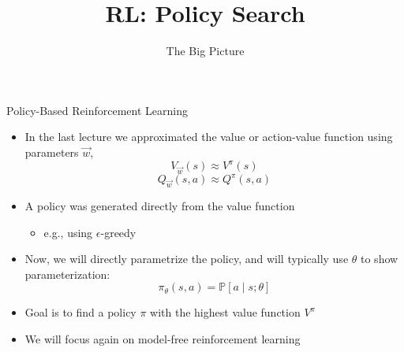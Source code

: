


\title[RL: Big Picture]{RL: Policy Search}
\subtitle{The Big Picture}




	
	\maketitle

\begin{frame}[c]{Policy-Based Reinforcement Learning}

\begin{itemize}
	\item In the last lecture we approximated the value or action-value function
	using parameters $\vec{w}$,
	$$V_{\vec{w}}(s) \approx V^\pi(s)$$
	$$Q_{\vec{w}}(s,a) \approx Q^\pi (s,a) $$
	\item A policy was generated directly from the value function
	\begin{itemize}
		\item e.g., using $\epsilon$-greedy
	\end{itemize}	
	\item Now, we will directly parametrize the policy, and will typically
	use $\theta$ to show parameterization:
	$$\pi_\theta (s,a) = \mathbb{P}[ a\mid s; \theta] $$
	\item Goal is to find a policy $\pi$ with the highest value function $V^\pi$
	\item We will focus again on model-free reinforcement learning
\end{itemize}

\end{frame}
